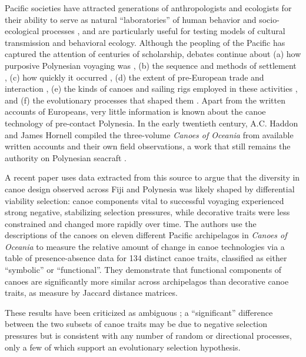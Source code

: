 \documentclass[11pt]{article}
\begin{document}
Pacific societies have attracted generations of anthropologists and ecologists for their ability to serve as natural ``laboratories'' of human behavior and socio-ecological processes \citep{Mead1957:PolynesianLab}, and are particularly useful for testing models of cultural transmission and behavioral ecology. Although the peopling of the Pacific has captured the attention of centuries of scholarship, debates continue about (a) how purposive Polynesian voyaging was \citep{Whyte2005:PolyHumanEvol}, (b) the sequence and methods of settlement \citep{Irwin1992}, (c) how quickly it occurred \citep{Anderson2000:Slowboats, Thomas2008:Lastpulse, Gray2009:Phylogenies}, (d) the extent of pre-European trade and interaction  \citep{Weisler1998}, (e) the kinds of canoes and sailing rigs employed in these activities \citep{Doran1981canoes, Anderson2001:SharpEnd}, and (f) the evolutionary processes that shaped them \citep{Horridge1987:IndonesiaCanoes}. Apart from the written accounts of Europeans, very little information is known about the canoe technology of pre-contact Polynesia. In the early twentieth century, A.C. Haddon and James Hornell compiled the three-volume \textit{Canoes of Oceania} from available written accounts and their own field observations, a work that still remains the authority on Polynesian seacraft \citep{HaddonHornell1936}.

A recent paper \citep{Rogers2008:Canoes} uses data extracted from this source to argue that the diversity in canoe design observed across Fiji and Polynesia was likely shaped by differential viability selection: canoe components vital to successful voyaging experienced strong negative, stabilizing selection pressures, while decorative traits were less constrained and changed more rapidly over time. The authors use the descriptions of the canoes on eleven different Pacific archipelagos in \textit{Canoes of Oceania} to measure the relative amount of change in canoe technologies via a table of presence-absence data for 134 distinct canoe traits, classified as either ``symbolic'' or ``functional''. They demonstrate that functional components of canoes are significantly more similar across archipelagos than decorative canoe traits, as measure by Jaccard distance matrices.

These results have been criticized as ambiguous \citep{Skoyles2008:canoechange}; a ``significant'' difference between the two subsets of canoe traits may be due to negative selection pressures but is consistent with any number of random or directional processes, only a few of which support an evolutionary selection hypothesis. 
\end{document}
